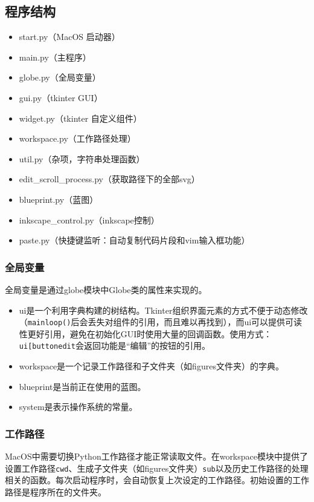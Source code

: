 \documentclass[AutoFakeBold,letterpaper,12pt,hidelinks]{article}
\begin{document}
\subsection{程序结构}
\begin{itemize}
\item
    start.py（MacOS 启动器）
\item
    main.py（主程序）
\item
    globe.py（全局变量）
\item
    gui.py（tkinter GUI）
\item
    widget.py（tkinter 自定义组件）
\item
    workspace.py（工作路径处理）
\item
    util.py（杂项，字符串处理函数）
\item
    edit\_scroll\_process.py（获取路径下的全部svg）
\item
    blueprint.py（蓝图）
\item
    inkscape\_control.py（inkscape控制）
\item
    paste.py（快捷键监听：自动复制代码片段和vim输入框功能）
\end{itemize}

\subsubsection{全局变量}

全局变量是通过globe模块中Globe类的属性来实现的。

\begin{itemize}
\item
  ui是一个利用字典构建的树结构。Tkinter组织界面元素的方式不便于动态修改（\texttt{mainloop()}后会丢失对组件的引用，而且难以再找到），而ui可以提供可读性更好引用，避免在初始化GUI时使用大量的回调函数。使用方式：\texttt{ui{[}\textquotesingle{}button\textquotesingle{}{]}{[}\textquotesingle{}edit\textquotesingle{}{]}}会返回功能是``编辑''的按钮的引用。
\item
  workspace是一个记录工作路径和子文件夹（如figures文件夹）的字典。
\item
  blueprint是当前正在使用的蓝图。
\item
  system是表示操作系统的常量。
\end{itemize}

\subsubsection{工作路径}

MacOS中需要切换Python工作路径才能正常读取文件。在workspace模块中提供了设置工作路径\texttt{cwd}、生成子文件夹（如figures文件夹）\texttt{sub}以及历史工作路径的处理相关的函数。每次启动程序时，会自动恢复上次设定的工作路径。初始设置的工作路径是程序所在的文件夹。
\end{document}
